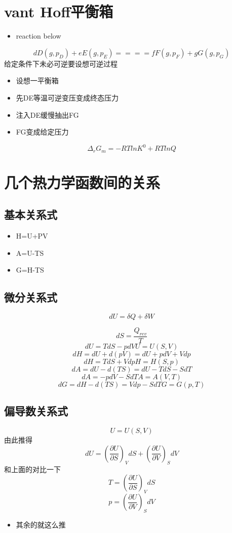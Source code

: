 \documentclass[11pt]{article}
\begin{document}
\section{vant Hoff平衡箱}
\label{sec:org17cceba}
\begin{itemize}
\item reaction below
\end{itemize}
\[
dD(g,p_D)+eE(g,p_E)==== fF(g,p_F)+gG(g,p_G)
\]
给定条件下未必可逆要设想可逆过程
\begin{itemize}
\item 设想一平衡箱

\item 先DE等温可逆变压变成终态压力
\item 注入DE缓慢抽出FG
\item FG变成给定压力
\end{itemize}

\[
\Delta_r G_m =-RTlnK^0 +RTlnQ
\]
\section{几个热力学函数间的关系}
\label{sec:orgd6cd78d}
\subsection{基本关系式}
\label{sec:org54276d2}
\begin{itemize}
\item H=U+PV
\item A=U-TS
\item G=H-TS
\end{itemize}
\subsection{微分关系式}
\label{sec:org2bf35c1}
\[
dU=\delta Q+\delta W
\]

\[
dS=\frac{Q_{rev}}{T}
\]
\[
dU=TdS-pdV U=U(S,V)
\]
\[
dH=dU+d(pV)=dU+pdV+Vdp
\]
\[
dH=TdS+Vdp H=H(S,p)
\]
\[
dA=dU-d(TS)=dU-TdS-SdT
\]
\[
dA=-pdV-SdT A=A(V,T)
\]
\[
dG=dH-d(TS)=Vdp-SdT G=G(p,T)
\]
\subsection{偏导数关系式}
\label{sec:org41e826e}
\[
U=U(S,V)
\]
由此推得
\[
dU=(\frac{\partial U}{\partial S})_V dS+(\frac{\partial U}{\partial V})_S dV
\]
和上面的对比一下
\[
T=(\frac{\partial U}{\partial S})_V dS
\]
\[
p=(\frac{\partial U}{\partial V})_S dV
\]
\begin{itemize}
\item 其余的就这么推
\end{itemize}
\end{document}
